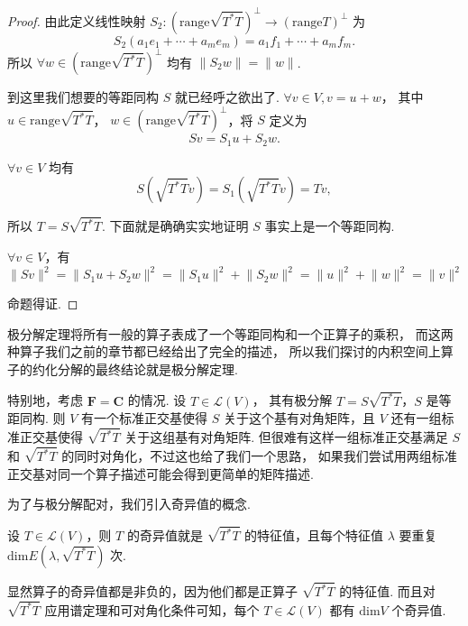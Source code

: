 \begin{proof}
    由此定义线性映射 $ S_2: (\mathrm{range}\sqrt{T^*T})^{\perp} \rightarrow (\mathrm{range}T)^{\perp} $ 为 
    \[
        S_2(a_1e_1 + \cdots + a_me_m) = a_1f_1 + \cdots + a_mf_m. 
    \]
    所以 $ \forall w \in (\mathrm{range}\sqrt{T^*T})^{\perp} $ 均有 $ \lVert S_2w \rVert = \lVert w \rVert $.

    到这里我们想要的等距同构 $ S $ 就已经呼之欲出了. 
    $ \forall v \in V, v = u + w $，
    其中 $ u \in \mathrm{range}\sqrt{T^*T} $，
    $ w \in (\mathrm{range}\sqrt{T^*T})^{\perp} $，将 $ S $ 定义为
    \[
        Sv = S_1u + S_2w. 
    \]

    $ \forall v \in V $ 均有 
    \[
        S(\sqrt{T^*T}v) = S_1(\sqrt{T^*T}v) = Tv,  
    \]
    
    所以 $ T = S\sqrt{T^*T} $. 下面就是确确实实地证明 $ S $ 事实上是一个等距同构. 
    
    $ \forall v \in V $，有 
    \[
        \lVert Sv \rVert^2 = \lVert S_1u + S_2w \rVert^2 
        = \lVert S_1u \rVert^2 + \lVert S_2w \rVert^2 = \lVert u \rVert^2 + \lVert w \rVert^2
        = \lVert v \rVert^2  
    \] 
    
    命题得证. 
\end{proof}

极分解定理将所有一般的算子表成了一个等距同构和一个正算子的乘积，
而这两种算子我们之前的章节都已经给出了完全的描述，
所以我们探讨的内积空间上算子的约化分解的最终结论就是极分解定理. 

特别地，考虑 $ \mathbf{F} = \mathbf{C} $ 的情况. 设 $ T \in \mathcal{L}(V) $，
其有极分解 $ T = S\sqrt{T^*T} $，$ S $ 是等距同构. 则 $ V $ 有一个标准正交基使得
$ S $ 关于这个基有对角矩阵，且 $ V $ 还有一组标准正交基使得 $ \sqrt{T^*T} $ 关于这组基有对角矩阵. 
但很难有这样一组标准正交基满足 $ S $ 和 $ \sqrt{T^*T} $ 的同时对角化，不过这也给了我们一个思路，
如果我们尝试用两组标准正交基对同一个算子描述可能会得到更简单的矩阵描述. 
 
为了与极分解配对，我们引入奇异值的概念. 

\begin{definition}
     设 $ T \in \mathcal{L}(V) $，则 $ T $ 的奇异值就是 $ \sqrt{T^*T} $
    的特征值，且每个特征值 $ \lambda $ 要重复 $ \mathrm{dim}E(\lambda, \sqrt{T^*T}) $ 次.  
\end{definition}

显然算子的奇异值都是非负的，因为他们都是正算子 $ \sqrt{T^*T} $ 的特征值. 
而且对 $ \sqrt{T^*T} $ 应用谱定理和可对角化条件可知，每个 $ T \in \mathcal{L}(V) $
都有 $ \mathrm{dim}V $ 个奇异值. 

